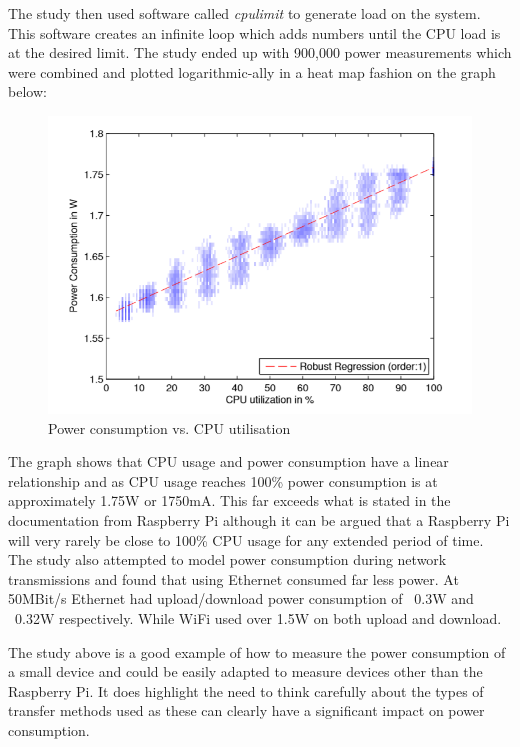 \documentclass[10pt,a4paper]{article}
\begin{document}
The study then used software called \textit{cpulimit} to generate load on the system. This software creates an infinite loop which adds numbers until the CPU load is at the desired limit. The study ended up with 900,000 power measurements which were combined and plotted logarithmic-ally in a heat map fashion on the graph below:

\begin{figure}[H]
\centering
  \includegraphics[width=\linewidth]{images/powerconsumption.png}
  \caption{Power consumption vs. CPU utilisation\cite{Kaup2014}}
  \label{fig:pwervscpu}
\end{figure}

The graph shows that CPU usage and power consumption have a linear relationship and as CPU usage reaches 100\% power consumption is at approximately 1.75W or 1750mA. This far exceeds what is stated in the documentation from Raspberry Pi although it can be argued that a Raspberry Pi will very rarely be close to 100\% CPU usage for any extended period of time. The study also attempted to model power consumption during network transmissions and found that using Ethernet consumed far less power. At 50MBit/s Ethernet had upload/download power consumption of ~0.3W and ~0.32W respectively. While WiFi used over 1.5W on both upload and download. 

The study above is a good example of how to measure the power consumption of a small device and could be easily adapted to measure devices other than the Raspberry Pi. It does highlight the need to think carefully about the types of transfer methods used as these can clearly have a significant impact on power consumption.
\end{document}
